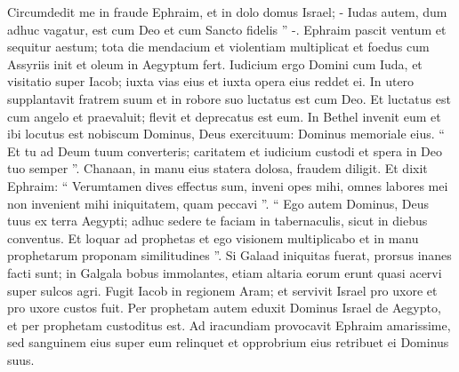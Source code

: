 \begin{biblechapter}
\begin{biblechapter}
\begin{biblechapter}
\begin{biblechapter}
\begin{biblechapter}
\begin{biblechapter}
\begin{biblechapter}
\begin{biblechapter}
\begin{biblechapter}
\begin{biblechapter}
\begin{biblechapter}
\begin{biblechapter}
 \verse Circumdedit me in fraude Ephraim,
 et in dolo domus Israel;
 - Iudas autem, dum adhuc vagatur, est cum Deo
 et cum Sancto fidelis ” -.
 \verse Ephraim pascit ventum
 et sequitur aestum;
 tota die mendacium et violentiam multiplicat
 et foedus cum Assyriis init
 et oleum in Aegyptum fert.
 \verse Iudicium ergo Domini cum Iuda,
 et visitatio super Iacob;
 iuxta vias eius et iuxta opera eius reddet ei.
 \verse In utero supplantavit fratrem suum
 et in robore suo luctatus est cum Deo.
 \verse Et luctatus est cum angelo et praevaluit;
 flevit et deprecatus est eum.
 In Bethel invenit eum
 et ibi locutus est nobiscum
 \verse Dominus, Deus exercituum:
 Dominus memoriale eius.
 \verse “ Et tu ad Deum tuum converteris;
 caritatem et iudicium custodi
 et spera in Deo tuo semper ”.
 \verse Chanaan, in manu eius statera dolosa,
 fraudem diligit.
 \verse Et dixit Ephraim: “ Verumtamen dives effectus sum,
 inveni opes mihi,
 omnes labores mei non invenient mihi
 iniquitatem, quam peccavi ”.
 \verse “ Ego autem Dominus, Deus tuus
 ex terra Aegypti;
 adhuc sedere te faciam in tabernaculis,
 sicut in diebus conventus.
 \verse Et loquar ad prophetas
 et ego visionem multiplicabo
 et in manu prophetarum proponam similitudines ”.
 \verse Si Galaad iniquitas fuerat,
 prorsus inanes facti sunt;
 in Galgala bobus immolantes,
 etiam altaria eorum erunt quasi acervi
 super sulcos agri.
 \verse Fugit Iacob in regionem Aram;
 et servivit Israel pro uxore
 et pro uxore custos fuit.
 \verse Per prophetam autem eduxit Dominus
 Israel de Aegypto,
 et per prophetam custoditus est.
 \verse Ad iracundiam provocavit Ephraim amarissime,
 sed sanguinem eius super eum relinquet
 et opprobrium eius retribuet ei Dominus suus.
 

\end{biblechapter}
\end{biblechapter}
\end{biblechapter}
\end{biblechapter}
\end{biblechapter}
\end{biblechapter}
\end{biblechapter}
\end{biblechapter}
\end{biblechapter}
\end{biblechapter}
\end{biblechapter}
\end{biblechapter}
